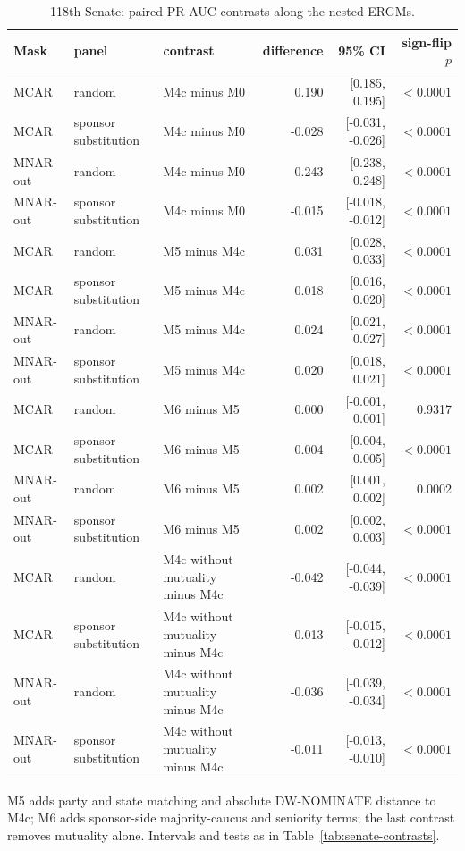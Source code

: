 \begin{table}[tbp]
\centering
\small
\caption{118th Senate: paired PR-AUC contrasts along the nested ERGMs.}
\label{tab:political-contrast}
\begin{tabular}{lllrrr}
\toprule
Mask & panel & contrast & difference & 95\% CI & sign-flip $p$ \\
\midrule
MCAR & random & M4c minus M0 & 0.190 & [0.185, 0.195] & $<0.0001$ \\
MCAR & sponsor substitution & M4c minus M0 & -0.028 & [-0.031, -0.026] & $<0.0001$ \\
MNAR-out & random & M4c minus M0 & 0.243 & [0.238, 0.248] & $<0.0001$ \\
MNAR-out & sponsor substitution & M4c minus M0 & -0.015 & [-0.018, -0.012] & $<0.0001$ \\
MCAR & random & M5 minus M4c & 0.031 & [0.028, 0.033] & $<0.0001$ \\
MCAR & sponsor substitution & M5 minus M4c & 0.018 & [0.016, 0.020] & $<0.0001$ \\
MNAR-out & random & M5 minus M4c & 0.024 & [0.021, 0.027] & $<0.0001$ \\
MNAR-out & sponsor substitution & M5 minus M4c & 0.020 & [0.018, 0.021] & $<0.0001$ \\
MCAR & random & M6 minus M5 & 0.000 & [-0.001, 0.001] & 0.9317 \\
MCAR & sponsor substitution & M6 minus M5 & 0.004 & [0.004, 0.005] & $<0.0001$ \\
MNAR-out & random & M6 minus M5 & 0.002 & [0.001, 0.002] & 0.0002 \\
MNAR-out & sponsor substitution & M6 minus M5 & 0.002 & [0.002, 0.003] & $<0.0001$ \\
MCAR & random & M4c without mutuality minus M4c & -0.042 & [-0.044, -0.039] & $<0.0001$ \\
MCAR & sponsor substitution & M4c without mutuality minus M4c & -0.013 & [-0.015, -0.012] & $<0.0001$ \\
MNAR-out & random & M4c without mutuality minus M4c & -0.036 & [-0.039, -0.034] & $<0.0001$ \\
MNAR-out & sponsor substitution & M4c without mutuality minus M4c & -0.011 & [-0.013, -0.010] & $<0.0001$ \\
\bottomrule
\end{tabular}
\par\vspace{2pt}\footnotesize M5 adds party and state matching and absolute DW-NOMINATE distance to M4c; M6 adds sponsor-side majority-caucus and seniority terms; the last contrast removes mutuality alone. Intervals and tests as in Table~\ref{tab:senate-contrasts}.
\end{table}